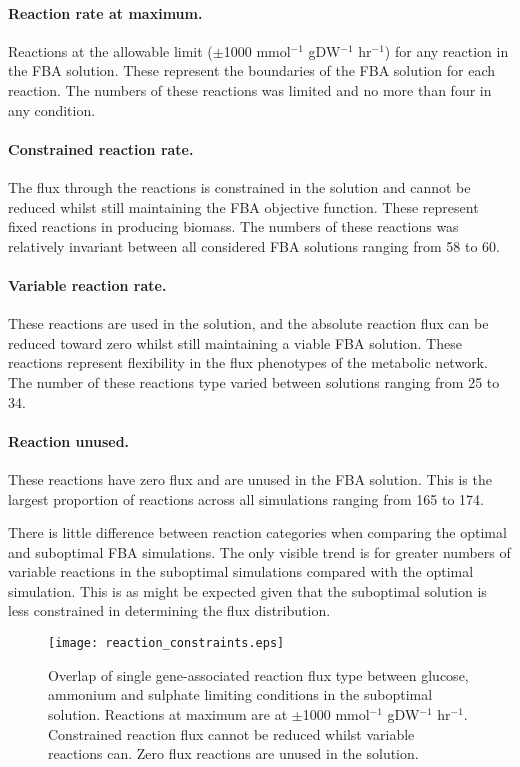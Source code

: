 \paragraph{Reaction rate at maximum.} Reactions at the allowable limit ($\pm$1000 mmol$^{-1}$ gDW$^{-1}$ hr$^{-1}$) for any reaction in the FBA solution. These represent the boundaries of the FBA solution for each reaction. The numbers of these reactions was limited and no more than four in any condition.

\paragraph{Constrained reaction rate.} The flux through the reactions is constrained in the solution and cannot be reduced whilst still maintaining the FBA objective function. These represent fixed reactions in producing biomass. The numbers of these reactions was relatively invariant between all considered FBA solutions ranging from 58 to 60.

\paragraph{Variable reaction rate.} These reactions are used in the solution, and the absolute reaction flux can be reduced toward zero whilst still maintaining a viable FBA solution. These reactions represent flexibility in the flux phenotypes of the metabolic network. The number of these reactions type varied between solutions ranging from 25 to 34.

\paragraph{Reaction unused.} These reactions have zero flux and are unused in the FBA solution. This is the largest proportion of reactions across all simulations ranging from 165 to 174.

There is little difference between reaction categories when comparing the optimal and suboptimal FBA simulations. The only visible trend is for greater numbers of variable reactions in the suboptimal simulations compared with the optimal simulation. This is as might be expected given that the suboptimal solution is less constrained in determining the flux distribution.

\begin{figure}%
  \centering
  \texttt{[image: reaction\_constraints.eps]}
  \caption[Overlap of reaction type between glucose, ammonium and sulphate limiting conditions]{Overlap of single gene-associated reaction flux type between glucose, ammonium and sulphate limiting conditions in the suboptimal solution. Reactions at maximum are at $\pm$1000 mmol$^{-1}$ gDW$^{-1}$ hr$^{-1}$. Constrained reaction flux cannot be reduced whilst variable reactions can. Zero flux reactions are unused in the solution. }
  \label{figure:reaction_constraints}
\end{figure}%

